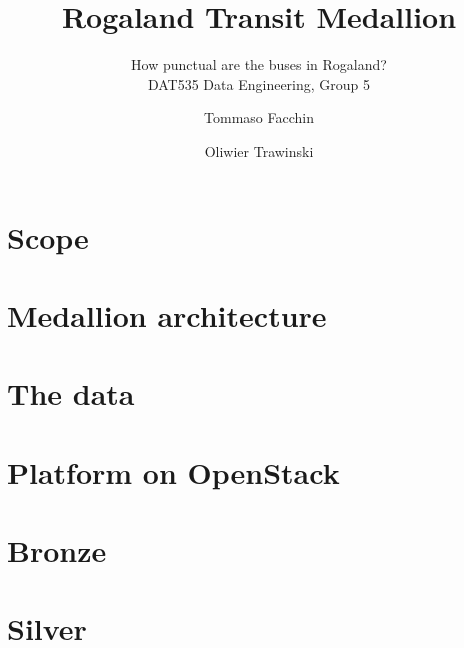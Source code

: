 \documentclass[sigconf]{acmart}
\begin{document}
\title{Rogaland Transit Medallion}
\subtitle{How punctual are the buses in Rogaland?\\DAT535 Data Engineering, Group 5}

\author{Tommaso Facchin}

\author{Oliwier Trawinski}


\begin{abstract}

\end{abstract}


\maketitle

\section{Scope}


\section{Medallion architecture}


\section{The data}
\label{sec:data}


\section{Platform on OpenStack}
\label{sec:platform}


\section{Bronze}
\label{sec:bronze}


\section{Silver}
\label{sec:silver}

\end{document}
